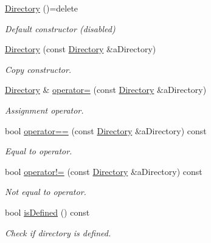 \begin{DoxyCompactItemize}
\item 
\hyperlink{classlibrary_1_1core_1_1fs_1_1_directory_a3ec39f6cad19a81d520e9a1f2d8bb1f7}{Directory} ()=delete
\begin{DoxyCompactList}\small\item\em Default constructor (disabled) \end{DoxyCompactList}\item 
\hyperlink{classlibrary_1_1core_1_1fs_1_1_directory_a5685b48aa8a6332caf0e4e253d8471f7}{Directory} (const \hyperlink{classlibrary_1_1core_1_1fs_1_1_directory}{Directory} \&a\+Directory)
\begin{DoxyCompactList}\small\item\em Copy constructor. \end{DoxyCompactList}\item 
\hyperlink{classlibrary_1_1core_1_1fs_1_1_directory}{Directory} \& \hyperlink{classlibrary_1_1core_1_1fs_1_1_directory_ae49af93d5b45fd410634ab14d82a690a}{operator=} (const \hyperlink{classlibrary_1_1core_1_1fs_1_1_directory}{Directory} \&a\+Directory)
\begin{DoxyCompactList}\small\item\em Assignment operator. \end{DoxyCompactList}\item 
bool \hyperlink{classlibrary_1_1core_1_1fs_1_1_directory_a7d1a76c04ba3750606c3f22519d0ef66}{operator==} (const \hyperlink{classlibrary_1_1core_1_1fs_1_1_directory}{Directory} \&a\+Directory) const
\begin{DoxyCompactList}\small\item\em Equal to operator. \end{DoxyCompactList}\item 
bool \hyperlink{classlibrary_1_1core_1_1fs_1_1_directory_a5ecb69d28fb615ca5ee4f24ef74f1074}{operator!=} (const \hyperlink{classlibrary_1_1core_1_1fs_1_1_directory}{Directory} \&a\+Directory) const
\begin{DoxyCompactList}\small\item\em Not equal to operator. \end{DoxyCompactList}\item 
bool \hyperlink{classlibrary_1_1core_1_1fs_1_1_directory_a82654fb35d41e8cad43a50f4f609993f}{is\+Defined} () const
\begin{DoxyCompactList}\small\item\em Check if directory is defined. \end{DoxyCompactList}\item 

\end{DoxyCompactItemize}
